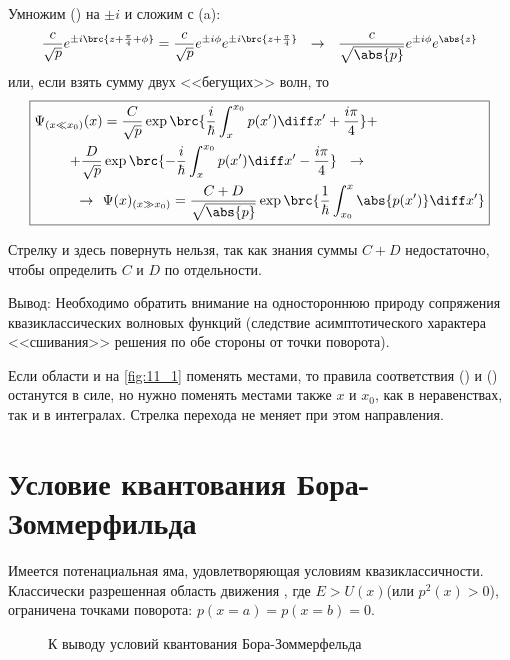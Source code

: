 Умножим () на $\pm i$ и сложим с (a):
$$
\frac{c}{\sqrt{p}} e^{\pm i\brc{z+\frac{\pi}{4}+\phi}} = \frac{c}{\sqrt{p}} e^{\pm i \phi} e^{\pm i\brc{z+\frac{\pi}{4}}} ~~\rightarrow~~
\frac{c}{\sqrt{\abs{p}}} e^{\pm i \phi} e^{\abs{z}}
$$
или, если взять сумму двух <<бегущих>> волн, то
$$
\boxed{
\begin{aligned}
	\Psi_{(x \ll x_0)}(x) &= \frac{C}{\sqrt{p}} \exp\brc{\frac{i}{\hbar} \int_{x}^{x_0} p(x') \diff x' + \frac{i\pi}{4}} 
	+ \\
	+ \frac{D}{\sqrt{p}} &\exp\brc{-\frac{i}{\hbar} \int_{x}^{x_0} p(x') \diff x' - \frac{i\pi}{4}} ~~\rightarrow~~ \\
	~~\rightarrow~~ &\Psi(x)_{(x \gg x_0)} = \frac{C+D}{\sqrt{\abs{p}}} \exp\brc{\frac{1}{\hbar} \int_{x_0}^{x} \abs{p(x')} \diff x'}
\end{aligned}
}
$$

Стрелку и здесь повернуть нельзя, так как знания суммы $C+D$ недостаточно, чтобы определить $C$ и $D$ по отдельности.

Вывод: Необходимо обратить внимание на одностороннюю природу сопряжения квазиклассических волновых функций (следствие асимптотического характера <<сшивания>> решения по обе стороны от точки поворота).

Если области  и  на \autoref{fig:11_1} поменять местами, то правила соответствия () и () останутся в силе, но нужно поменять местами также $x$ и $x_0$, как в неравенствах, так и в интегралах. Стрелка перехода не меняет при этом направления.

\section{Условие квантования Бора-Зоммерфильда}

Имеется потенациальная яма, удовлетворяющая условиям квазиклассичности. Классически разрешенная область движения , где $E > U(x)$(или $p^2(x) > 0$), ограничена точками поворота: $p(x=a) = p(x=b) = 0$.

\begin{figure}[h]
\centering
{}
\caption{К выводу условий квантования Бора-Зоммерфельда} \label{fig:11_4}
\end{figure}

